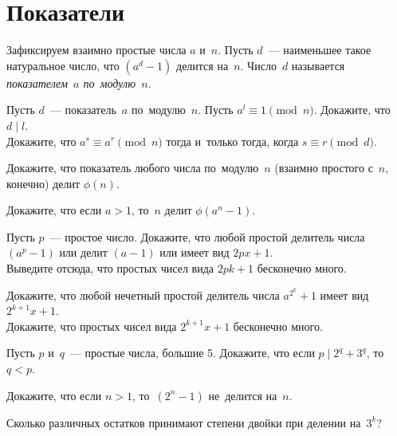 
\section*{Показатели}


Зафиксируем взаимно простые числа $a$ и~$n$.
Пусть $d$~--- наименьшее такое натуральное число, что $(a^d - 1)$ делится
на~$n$.
Число~$d$ называется \emph{показателем~$a$ по~модулю~$n$}.

\begin{problems}

\item
\subproblem
Пусть $d$~--- показатель~$a$ по~модулю~$n$.
Пусть $a^l \equiv 1 \pmod{n}$.
Докажите, что $d \mid l$.
\\
\subproblem
Докажите, что $a^s \equiv a^r \pmod{n}$ тогда и~только тогда, когда
$s \equiv r \pmod{d}$.

\item
Докажите, что показатель любого числа по~модулю~$n$ (взаимно простого с~$n$,
конечно) делит $\phi(n)$.

\item
Докажите, что если $a > 1$, то~$n$ делит $\phi(a^n - 1)$.

\item
\subproblem
Пусть $p$~--- простое число.
Докажите, что любой простой делитель числа $(a^p - 1)$ или делит $(a - 1)$ или
имеет вид $2 p x + 1$.
\\
\subproblem
Выведите отсюда, что простых чисел вида $2 p k + 1$ бесконечно много.

\item
\subproblem
Докажите, что любой нечетный простой делитель числа $a^{2^{k}} + 1$ имеет вид
$2^{k+1} x + 1$.
\\
\subproblem
Докажите, что простых чисел вида $2^{k+1} x + 1$ бесконечно много.

\item
Пусть $p$ и~$q$~--- простые числа, большие 5.
Докажите, что если $p \mid 2^q + 3^q$, то~$q < p$.

\item
Докажите, что если $n > 1$, то~$(2^n - 1)$ не~делится на~$n$. 

\item
Сколько различных остатков принимают степени двойки при делении на~$3^k$?

\end{problems}

